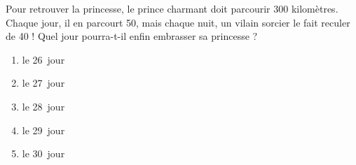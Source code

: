Pour retrouver la princesse, le prince charmant doit parcourir 300
kilomètres. Chaque jour, il en parcourt 50, mais chaque nuit, un
vilain sorcier le fait reculer de 40 ! Quel jour pourra-t-il enfin
embrasser sa princesse ?
\begin{multicols}{5}
  \begin{enumerate}[A/]
  \item le 26\ieme\ jour
  \item le 27\ieme\ jour
  \item le 28\ieme\ jour
  \item le 29\ieme\ jour
  \item le 30\ieme\ jour
  \end{enumerate}
\end{multicols}